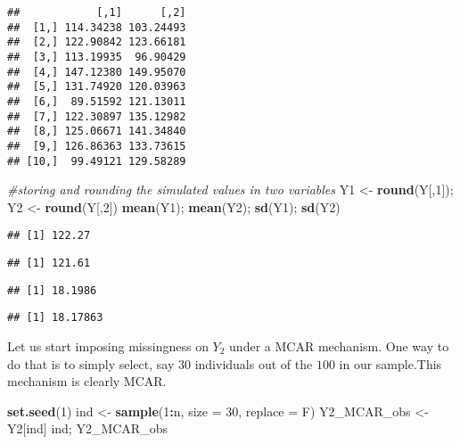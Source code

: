 \documentclass[
]{article}
\newenvironment{Shaded}{\begin{snugshade}}{\end{snugshade}}
\newcommand{\AttributeTok}[1]{\textcolor[rgb]{0.13,0.29,0.53}{#1}}
\newcommand{\CommentTok}[1]{\textcolor[rgb]{0.56,0.35,0.01}{\textit{#1}}}
\newcommand{\DecValTok}[1]{\textcolor[rgb]{0.00,0.00,0.81}{#1}}
\newcommand{\FunctionTok}[1]{\textcolor[rgb]{0.13,0.29,0.53}{\textbf{#1}}}
\newcommand{\NormalTok}[1]{#1}
\newcommand{\OtherTok}[1]{\textcolor[rgb]{0.56,0.35,0.01}{#1}}
\newcommand{\SpecialCharTok}[1]{\textcolor[rgb]{0.81,0.36,0.00}{\textbf{#1}}}
\begin{document}
\begin{verbatim}
##            [,1]      [,2]
##  [1,] 114.34238 103.24493
##  [2,] 122.90842 123.66181
##  [3,] 113.19935  96.90429
##  [4,] 147.12380 149.95070
##  [5,] 131.74920 120.03963
##  [6,]  89.51592 121.13011
##  [7,] 122.30897 135.12982
##  [8,] 125.06671 141.34840
##  [9,] 126.86363 133.73615
## [10,]  99.49121 129.58289
\end{verbatim}

\begin{Shaded}
\begin{Highlighting}[]
\CommentTok{\#storing and rounding the simulated values in two variables}
\NormalTok{Y1 }\OtherTok{\textless{}{-}} \FunctionTok{round}\NormalTok{(Y[,}\DecValTok{1}\NormalTok{]); Y2 }\OtherTok{\textless{}{-}} \FunctionTok{round}\NormalTok{(Y[,}\DecValTok{2}\NormalTok{])}
\FunctionTok{mean}\NormalTok{(Y1); }\FunctionTok{mean}\NormalTok{(Y2); }\FunctionTok{sd}\NormalTok{(Y1); }\FunctionTok{sd}\NormalTok{(Y2)}
\end{Highlighting}
\end{Shaded}

\begin{verbatim}
## [1] 122.27
\end{verbatim}

\begin{verbatim}
## [1] 121.61
\end{verbatim}

\begin{verbatim}
## [1] 18.1986
\end{verbatim}

\begin{verbatim}
## [1] 18.17863
\end{verbatim}

Let us start imposing missingness on \(Y_2\) under a MCAR mechanism. One
way to do that is to simply select, say \(30\) individuals out of the
\(100\) in our sample.This mechanism is clearly MCAR.

\begin{Shaded}
\begin{Highlighting}[]
\FunctionTok{set.seed}\NormalTok{(}\DecValTok{1}\NormalTok{)}
\NormalTok{ind }\OtherTok{\textless{}{-}} \FunctionTok{sample}\NormalTok{(}\DecValTok{1}\SpecialCharTok{:}\NormalTok{n, }\AttributeTok{size =} \DecValTok{30}\NormalTok{, }\AttributeTok{replace =}\NormalTok{ F)}
\NormalTok{Y2\_MCAR\_obs }\OtherTok{\textless{}{-}}\NormalTok{ Y2[ind]}
\NormalTok{ind; Y2\_MCAR\_obs}
\end{Highlighting}
\end{Shaded}
\end{document}
